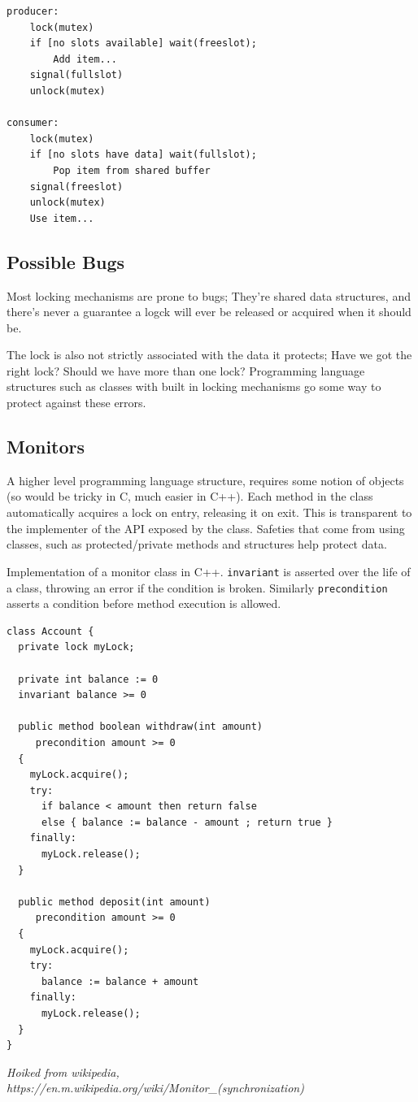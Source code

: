 \documentclass{article}
\begin{document}
\begin{verbatim}
producer:
    lock(mutex)
    if [no slots available] wait(freeslot);
        Add item...
    signal(fullslot)
    unlock(mutex)

consumer:
    lock(mutex)
    if [no slots have data] wait(fullslot);
        Pop item from shared buffer
    signal(freeslot)
    unlock(mutex)
    Use item...
\end{verbatim}

\subsection{Possible Bugs}

Most locking mechanisms are prone to bugs; They're shared data structures, and there's never a
guarantee a logck will ever be released or acquired when it should be.

The lock is also not strictly associated with the data it protects; Have we got the right lock? 
Should we have more than one lock? Programming language structures
such as classes with built in locking mechanisms go some way to protect against these errors.


\subsection{Monitors}

A higher level programming language structure, requires some notion of objects (so would be tricky 
in C, much easier in C++). Each method in the class automatically acquires a lock on entry, 
releasing it on exit. This is transparent to the implementer of the API exposed by the class. 
Safeties that come from using classes, such as protected/private methods and structures help protect data.

Implementation of a monitor class in C++. \verb|invariant| is asserted over the life of a class, throwing an
error if the condition is broken. Similarly \verb|precondition| asserts a condition before method
execution is allowed. 

\begin{verbatim}
class Account {
  private lock myLock;

  private int balance := 0
  invariant balance >= 0

  public method boolean withdraw(int amount)
     precondition amount >= 0
  {
    myLock.acquire();
    try:
      if balance < amount then return false
      else { balance := balance - amount ; return true }
    finally:
      myLock.release();
  }

  public method deposit(int amount)
     precondition amount >= 0
  {
    myLock.acquire();
    try:
      balance := balance + amount
    finally:
      myLock.release();
  }
}
\end{verbatim}
\emph{Hoiked from wikipedia, https://en.m.wikipedia.org/wiki/Monitor\_(synchronization)}
\end{document}

